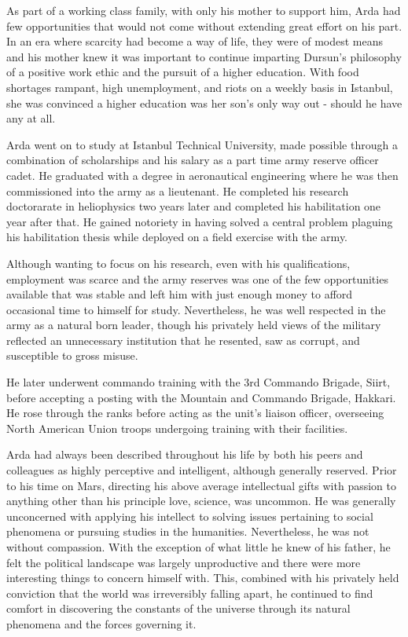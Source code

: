As part of a working class family, with only his mother to support him, Arda had few opportunities that would not come without extending great effort on his part. In an era where scarcity had become a way of life, they were of modest means and his mother knew it was important to continue imparting Dursun's philosophy of a positive work ethic and the pursuit of a higher education. With food shortages rampant, high unemployment, and riots on a weekly basis in Istanbul, she was convinced a higher education was her son's only way out - should he have any at all.

Arda went on to study at Istanbul Technical University, made possible through a combination of scholarships and his salary as a part time army reserve officer cadet. He graduated with a degree in aeronautical engineering where he was then commissioned into the army as a lieutenant. He completed his research doctorarate in heliophysics two years later and completed his habilitation one year after that. He gained notoriety in having solved a central problem plaguing his habilitation thesis while deployed on a field exercise with the army.

Although wanting to focus on his research, even with his qualifications, employment was scarce and the army reserves was one of the few opportunities available that was stable and left him with just enough money to afford occasional time to himself for study. Nevertheless, he was well respected in the army as a natural born leader, though his privately held views of the military reflected an unnecessary institution that he resented, saw as corrupt, and susceptible to gross misuse.

He later underwent commando training with the 3rd Commando Brigade, Siirt, before accepting a posting with the Mountain and Commando Brigade, Hakkari. He rose through the ranks before acting as the unit's liaison officer, overseeing North American Union troops undergoing training with their facilities.

Arda had always been described throughout his life by both his peers and colleagues as highly perceptive and intelligent, although generally reserved. Prior to his time on Mars, directing his above average intellectual gifts with passion to anything other than his principle love, science, was uncommon. He was generally unconcerned with applying his intellect to solving issues pertaining to social phenomena or pursuing studies in the humanities. Nevertheless, he was not without compassion. With the exception of what little he knew of his father, he felt the political landscape was largely unproductive and there were more interesting things to concern himself with. This, combined with his privately held conviction that the world was irreversibly falling apart, he continued to find comfort in discovering the constants of the universe through its natural phenomena and the forces governing it.

